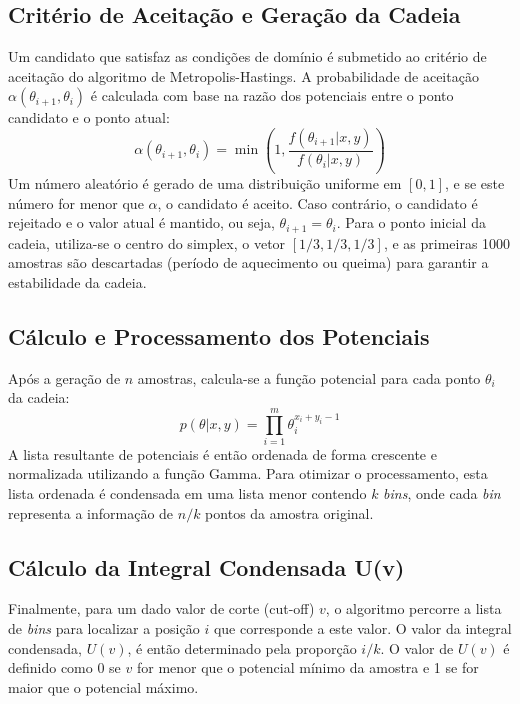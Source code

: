 \documentclass[12pt, a4paper]{article}
\begin{document}
\subsection{Critério de Aceitação e Geração da Cadeia}
Um candidato que satisfaz as condições de domínio é submetido ao critério de aceitação do algoritmo de Metropolis-Hastings. A probabilidade de aceitação $\alpha(\theta_{i+1}, \theta_i)$ é calculada com base na razão dos potenciais entre o ponto candidato e o ponto atual:
\begin{equation}
    \alpha(\theta_{i+1}, \theta_i) = \min\left(1, \frac{f(\theta_{i+1}|x,y)}{f(\theta_i|x,y)}\right)
\end{equation}
Um número aleatório é gerado de uma distribuição uniforme em $[0,1]$, e se este número for menor que $\alpha$, o candidato é aceito. Caso contrário, o candidato é rejeitado e o valor atual é mantido, ou seja, $\theta_{i+1} = \theta_i$. Para o ponto inicial da cadeia, utiliza-se o centro do simplex, o vetor $[1/3, 1/3, 1/3]$, e as primeiras 1000 amostras são descartadas (período de aquecimento ou queima) para garantir a estabilidade da cadeia.

\subsection{Cálculo e Processamento dos Potenciais}
Após a geração de $n$ amostras, calcula-se a função potencial para cada ponto $\theta_i$ da cadeia:
\begin{equation}
    p(\theta|x,y) = \prod_{i=1}^{m} \theta_i^{x_i+y_i-1}
\end{equation}
A lista resultante de potenciais é então ordenada de forma crescente e normalizada utilizando a função Gamma. Para otimizar o processamento, esta lista ordenada é condensada em uma lista menor contendo $k$ \textit{bins}, onde cada \textit{bin} representa a informação de $n/k$ pontos da amostra original.

\subsection{Cálculo da Integral Condensada U(v)}
Finalmente, para um dado valor de corte (cut-off) $v$, o algoritmo percorre a lista de \textit{bins} para localizar a posição $i$ que corresponde a este valor. O valor da integral condensada, $U(v)$, é então determinado pela proporção $i/k$. O valor de $U(v)$ é definido como 0 se $v$ for menor que o potencial mínimo da amostra e 1 se for maior que o potencial máximo.
\end{document}

